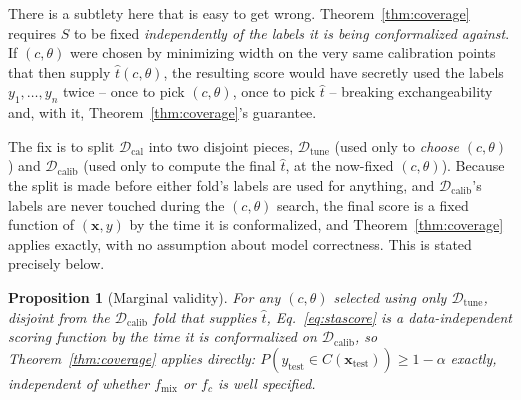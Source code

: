 \documentclass[11pt]{article}
\newtheorem{proposition}{Proposition}[section]
\begin{document}
There is a subtlety here that is easy to get wrong. Theorem~\ref{thm:coverage} requires $S$ to be
fixed \emph{independently of the labels it is being conformalized against}. If $(c,\theta)$ were
chosen by minimizing width on the very same calibration points that then supply $\hat t(c,\theta)$,
the resulting score would have secretly used the labels $y_1,\dots,y_n$ twice -- once to pick
$(c,\theta)$, once to pick $\hat t$ -- breaking exchangeability and, with it,
Theorem~\ref{thm:coverage}'s guarantee.

The fix is to split $\mathcal D_{\mathrm{cal}}$ into two disjoint pieces, $\mathcal
D_{\mathrm{tune}}$ (used only to \emph{choose} $(c,\theta)$) and $\mathcal D_{\mathrm{calib}}$
(used only to compute the final $\hat t$, at the now-fixed $(c,\theta)$). Because the split is
made before either fold's labels are used for anything, and $\mathcal D_{\mathrm{calib}}$'s
labels are never touched during the $(c,\theta)$ search, the final score is a fixed function of
$(\bm x,y)$ by the time it is conformalized, and Theorem~\ref{thm:coverage} applies exactly, with
no assumption about model correctness. This is stated precisely below.

\begin{proposition}[Marginal validity]
\label{prop:stavalidity}
For any $(c,\theta)$ selected using only $\mathcal D_{\mathrm{tune}}$, disjoint from the $\mathcal
D_{\mathrm{calib}}$ fold that supplies $\hat t$, Eq.~\eqref{eq:stascore} is a data-independent
scoring function by the time it is conformalized on $\mathcal D_{\mathrm{calib}}$, so
Theorem~\ref{thm:coverage} applies directly: $P(y_{\mathrm{test}}\in\hat C(\bm x_{\mathrm{test}}))
\ge 1-\alpha$ exactly, independent of whether $f_{\mathrm{mix}}$ or $f_c$ is well specified.
\end{proposition}
\end{document}
